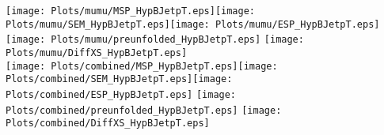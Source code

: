 \documentclass[a4paper,10pt,landscape,pagesize]{scrartcl}
\begin{document}
\texttt{[image: Plots/mumu/MSP\_HypBJetpT.eps]}\texttt{[image: Plots/mumu/SEM\_HypBJetpT.eps]}\texttt{[image: Plots/mumu/ESP\_HypBJetpT.eps]} \texttt{[image: Plots/mumu/preunfolded\_HypBJetpT.eps]} \texttt{[image: Plots/mumu/DiffXS\_HypBJetpT.eps]}\\
\texttt{[image: Plots/combined/MSP\_HypBJetpT.eps]}\texttt{[image: Plots/combined/SEM\_HypBJetpT.eps]}\texttt{[image: Plots/combined/ESP\_HypBJetpT.eps]} \texttt{[image: Plots/combined/preunfolded\_HypBJetpT.eps]} \texttt{[image: Plots/combined/DiffXS\_HypBJetpT.eps]}
\end{document}
